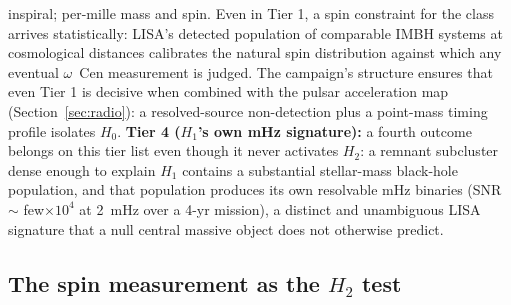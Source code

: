 \documentclass[11pt]{article}
\newcommand{\ocen}{\ensuremath{\omega}~Cen}
\begin{document}
inspiral; per-mille mass and spin. Even in Tier 1, a spin constraint for the class arrives statistically: LISA's detected population of comparable IMBH systems at cosmological distances calibrates the natural spin distribution against which any eventual \ocen{} measurement is judged. The campaign's structure ensures that even Tier 1 is decisive when combined with the pulsar acceleration map (Section~\ref{sec:radio}): a resolved-source non-detection plus a point-mass timing profile isolates $H_0$. \textbf{Tier 4 ($H_1$'s own mHz signature):} a fourth outcome belongs on this tier list even though it never activates $H_2$: a remnant subcluster dense enough to explain $H_1$ contains a substantial stellar-mass black-hole population, and that population produces its own resolvable mHz binaries (SNR $\sim$ few$\times10^{4}$ at 2~mHz over a 4-yr mission), a distinct and unambiguous LISA signature that a null central massive object does not otherwise predict.

\subsection{The spin measurement as the $H_2$ test}
\end{document}
